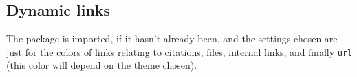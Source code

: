 \documentclass{tutodoc}
\begin{document}
\subsection{Dynamic links}

The  package is imported, if it hasn't already been, and the settings chosen are just for the colors of links relating to citations, files, internal links, and finally \verb#url# (this color will depend on the theme chosen).
\end{document}
